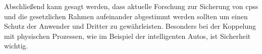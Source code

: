 \documentclass[final,bibliography=totocnumbered]{include/sikseminar}
\newcommand{\cps}{\glspl{cps}\xspace}
\begin{document}
    Abschließend kann gesagt werden, dass aktuelle Forschung zur Sicherung von \cps und die gesetzlichen Rahmen aufeinander abgestimmt werden sollten um einen Schutz der Anwender und Dritter zu gewährleisten.
    Besonders bei der Koppelung mit physischen Prozessen, wie im Beispiel der intelligenten Autos, ist Sicherheit wichtig.

    \newpage

    \printbibliography
    \newpage
\end{document}
